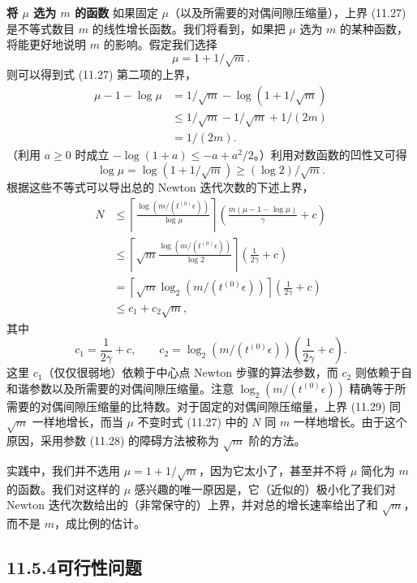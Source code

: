 \documentclass[UTF8,12pt,a4paper,fontset=fandol]{ctexart}
\begin{document}
\noindent\textbf{将 $\mu$ 选为 $m$ 的函数}\quad
如果固定 $\mu$（以及所需要的对偶间隙压缩量），上界 (11.27) 是不等式数目 $m$ 的线性增长函数。我们将看到，如果把 $\mu$ 选为 $m$ 的某种函数，将能更好地说明 $m$ 的影响。假定我们选择
\begin{equation}
\mu=1+1/\sqrt{m}.
\tag{11.28}
\end{equation}
则可以得到式 (11.27) 第二项的上界，
\[
\begin{aligned}
\mu-1-\log\mu
&=1/\sqrt{m}-\log(1+1/\sqrt{m})\\
&\leq 1/\sqrt{m}-1/\sqrt{m}+1/(2m)\\
&=1/(2m).
\end{aligned}
\]
（利用 $a\geq 0$ 时成立 $-\log(1+a)\leq -a+a^2/2$。）利用对数函数的凹性又可得
\[
\log\mu=\log(1+1/\sqrt{m})\geq(\log 2)/\sqrt{m}.
\]
根据这些不等式可以导出总的 Newton 迭代次数的下述上界，
\begin{equation}
\begin{aligned}
N&\leq \left\lceil\frac{\log(m/(t^{(0)}\epsilon))}{\log\mu}\right\rceil
\left(\frac{m(\mu-1-\log\mu)}{\gamma}+c\right)\\
&\leq \left\lceil\sqrt{m}\frac{\log(m/(t^{(0)}\epsilon))}{\log 2}\right\rceil
\left(\frac{1}{2\gamma}+c\right)\\
&=\left\lceil\sqrt{m}\log_2(m/(t^{(0)}\epsilon))\right\rceil
\left(\frac{1}{2\gamma}+c\right)\\
&\leq c_1+c_2\sqrt{m},
\end{aligned}
\tag{11.29}
\end{equation}
其中
\[
c_1=\frac{1}{2\gamma}+c,\qquad
c_2=\log_2(m/(t^{(0)}\epsilon))\left(\frac{1}{2\gamma}+c\right).
\]
这里 $c_1$（仅仅很弱地）依赖于中心点 Newton 步骤的算法参数，而 $c_2$ 则依赖于自和谐参数以及所需要的对偶间隙压缩量。注意 $\log_2(m/(t^{(0)}\epsilon))$ 精确等于所需要的对偶间隙压缩量的比特数。对于固定的对偶间隙压缩量，上界 (11.29) 同 $\sqrt{m}$ 一样地增长，而当 $\mu$ 不变时式 (11.27) 中的 $N$ 同 $m$ 一样地增长。由于这个原因，采用参数 (11.28) 的障碍方法被称为 $\sqrt{m}$ 阶的方法。

实践中，我们并不选用 $\mu=1+1/\sqrt{m}$，因为它太小了，甚至并不将 $\mu$ 简化为 $m$ 的函数。我们对这样的 $\mu$ 感兴趣的唯一原因是，它（近似的）极小化了我们对 Newton 迭代次数给出的（非常保守的）上界，并对总的增长速率给出了和 $\sqrt{m}$，而不是 $m$，成比例的估计。

\subsection*{11.5.4\quad 可行性问题}
\end{document}
